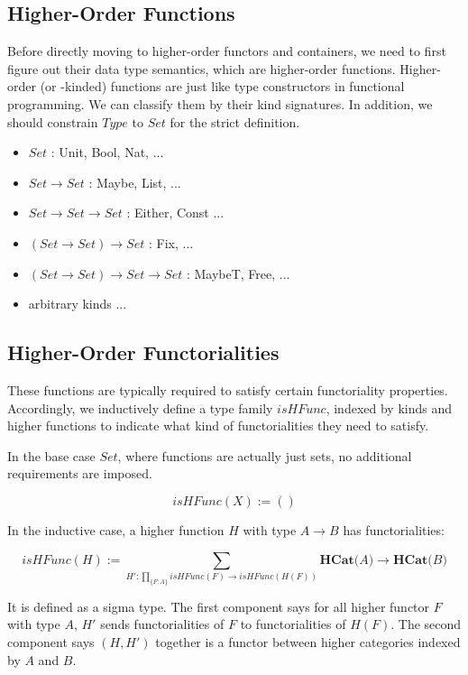 \subsection{Higher-Order Functions}

Before directly moving to higher-order functors and containers, we need to first figure out their data type semantics, which are higher-order functions. Higher-order (or -kinded) functions are just like type constructors in functional programming. We can classify them by their kind signatures. In addition, we should constrain $Type$ to $Set$ for the strict definition.

\begin{itemize}
  \item{$Set$ : Unit, Bool, Nat, ...} 
  \item{$Set \to Set$ : Maybe, List, ...}
  \item{$Set \to Set \to Set$ : Either, Const ...}
  \item{$(Set \to Set) \to Set$ : Fix, ...}
  \item{$(Set \to Set) \to Set \to Set$ : MaybeT, Free, ...}
  \item{arbitrary kinds ...}
\end{itemize}



\subsection{Higher-Order Functorialities}

These functions are typically required to satisfy certain functoriality properties. Accordingly, we inductively define a type family $isHFunc$, indexed by kinds and higher functions to indicate what kind of functorialities they need to satisfy.

In the base case $Set$, where functions are actually just sets, no additional requirements are imposed.

\[ isHFunc(X) := () \]

In the inductive case, a higher function $H$ with type $A \to B$ has functorialities:

\[ isHFunc(H) := \sum_{H' : \prod_{\{F : A\}} isHFunc(F) \to isHFunc(H(F))} \textbf{HCat(} A \textbf{)} \to \textbf{HCat(} B \textbf{)} \]

It is defined as a sigma type. The first component says for all higher functor $F$ with type $A$, $H'$ sends functorialities of $F$ to functorialities of $H(F)$. The second component says $(H , H')$ together is a functor between higher categories indexed by $A$ and $B$.

